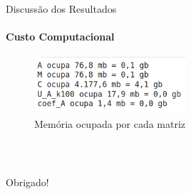 \documentclass[xcolor=dvipsnames,t,aspectratio=169]{beamer} %
\begin{document}
\begin{frame}[c]{Discussão dos Resultados}
\framesubtitle{Custo Computacional}

    \begin{figure}[H]
                  \centering
                  \includegraphics[width=0.5\textwidth]{img/memoria_ocupada.png}
                  \caption{Memória ocupada por cada matriz}
                  \label{fig:exemplo}
        \end{figure}

\end{frame}

\begin{frame}[c]
\frametitle{~}
    
    \begin{center}
        {\Huge Obrigado!}
    \end{center}
    
\end{frame}
\end{document}
